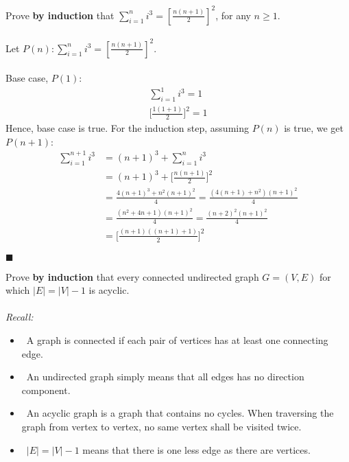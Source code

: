 \documentclass[12pt,twoside]{article}
\begin{document}
\begin{problems}
\problem Prove \textbf{by induction}  that 
         $\sum_{i=1}^{n} i^3 = [\frac{n(n+1)}{2}]^2  $,
         for any $n \geq 1$. \\ 
\\
\proof Let $P(n): \sum_{i=1}^{n} i^3 = [\frac{n(n+1)}{2}]^2  $.\\
    \\
    Base case, $P(1)$:  
    \begin{align}
        \sum_{i=1}^{1} i^3 = 1 \\
        \biggl[\frac{1(1+1)}{2}\biggr]^2 = 1
    \end{align}
    Hence, base case is true. For the induction step, assuming $P(n)$
    is true, we get $P(n+1)$:
    \begin{align}
        \sum_{i=1}^{n+1} i^{3} &= (n+1)^{3} + \sum_{i=1}^{n} i^{3}  \\
                                &= (n+1)^{3} + \biggl[\frac{n(n+1)}{2}\biggr]^2  \\
                                &= \frac{4(n+1)^3 + n^2(n+1)^2}{4}
                                 = \frac{(4(n+1) + n^2)(n+1)^2}{4} \\
                                &= \frac{(n^2 + 4n + 1)(n+1)^2}{4}  
                                 = \frac{(n+2)^2(n+1)^2}{4} \\
                                &= \biggl[\frac{(n+1)((n+1) + 1)}{2}\biggr]^{2}
    \end{align}

\null\hfill $\blacksquare$



\newpage
\problem Prove \textbf{by induction}  that every connected undirected graph $G=(V,E)$
for which $|E|=|V|-1$ is acyclic. \\
\\
\textit{Recall:}
    \begin{itemize}
        \item \ A graph is connected if each pair of vertices has at least one
            connecting edge.
        \item \ An undirected graph simply means that all edges has no direction
            component.
        \item \ An acyclic graph is a graph that contains no cycles. When
            traversing the graph from vertex to vertex, no same vertex shall be
            visited twice.
        \item \ $|E|=|V|-1$ means that there is one less edge as there are
            vertices.
    \end{itemize}


\end{problems}
\end{document}
